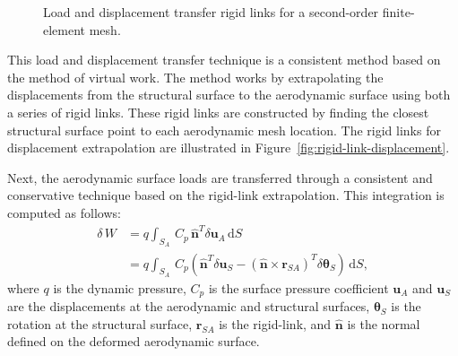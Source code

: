 \documentclass[]{aiaa-tc}
\newcommand{\mb}{\mathbf}
\newcommand{\mbs}{\boldsymbol}
\begin{document}
\begin{figure}
  \centering
  \caption{Load and displacement transfer rigid links for a
    second-order finite-element mesh.}
\end{figure}

This load and displacement transfer technique is a consistent method
based on the method of virtual work. The method works by extrapolating
the displacements from the structural surface to the aerodynamic
surface using both a series of rigid links. These rigid links are
constructed by finding the closest structural surface point to each
aerodynamic mesh location. The rigid links for displacement
extrapolation are illustrated in
Figure~\ref{fig:rigid-link-displacement}.

Next, the aerodynamic surface loads are transferred through a
consistent and conservative technique based on the rigid-link
extrapolation. This integration is computed as follows:
\begin{equation}
  \begin{aligned}
    \delta\, W & = q \int_{S_{A}} \, C_{p} \, \hat{\mb{n}}^{T} \delta\mb{u}_{A} \, \mathrm{d}S \\
    & = q\int_{S_{A}} \, C_{p} \left( \hat{\mb{n}}^{T} \delta \mathbf{u}_{S} -
    \left( \hat{\mb{n}}\times \mb{r}_{SA} \right)^{T} \delta \mbs{\theta}_{S} \right) \, \mathrm{d}S,
  \end{aligned}
  \label{eqn:method-virtual-work}
\end{equation}
where $q$ is the dynamic pressure, $C_{p}$ is the surface pressure
coefficient $\mb{u}_{A}$ and $\mb{u}_{S}$ are the displacements at the
aerodynamic and structural surfaces, $\mbs{\theta}_{S}$ is the
rotation at the structural surface, $\mb{r}_{SA}$ is the rigid-link,
and $\hat{\mb{n}}$ is the normal defined on the deformed aerodynamic
surface.
\end{document}

